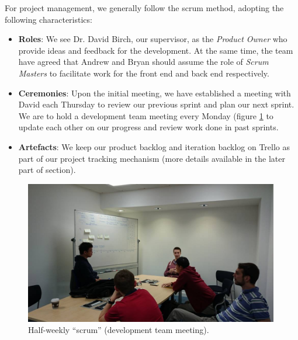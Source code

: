 \documentclass[a4paper]{article}
\begin{document}
For project management, we generally follow the scrum method, adopting the
following characteristics:
\begin{itemize}
  \item \textbf{Roles}: We see Dr. David Birch, our supervisor, as the \textit{Product Owner}
        who provide ideas and feedback for the development. At the same time,
        the team have agreed that Andrew and Bryan should assume the role of
        \textit{Scrum Masters} to facilitate work for the front end and back end respectively.
  \item \textbf{Ceremonies}: Upon the initial meeting, we have established a
        meeting with David each Thursday to review our previous sprint 
        and plan our next sprint. We are to hold a development team
        meeting every Monday (figure \ref{fig:scrum} to update each other 
        on our progress and review work done in past sprints.
  \item \textbf{Artefacts}: We keep our product backlog and iteration backlog on
        Trello as part of our project tracking mechanism (more details
        available in the later part of section).
\end{itemize}


\begin{figure}[ht]
  \centering
    \includegraphics[width = 0.99\textwidth]{./planning/scrum.jpg}
   
  \caption{Half-weekly ``scrum'' (development team meeting).}
  \label{fig:scrum}
\end{figure}
\end{document}
